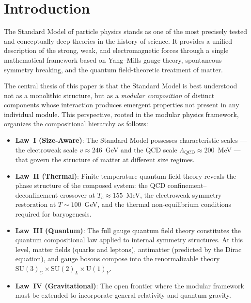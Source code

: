 \documentclass[12pt]{article}
\theoremstyle{definition}
\theoremstyle{remark}
\newcommand{\su}[1]{\mathrm{SU}(#1)}
\newcommand{\uu}[1]{\mathrm{U}(#1)}
\begin{document}
\tableofcontents
\newpage

\section{Introduction}
\label{sec:introduction}

The Standard Model of particle physics stands as one of the most precisely tested and conceptually deep theories in the history of science. It provides a unified description of the strong, weak, and electromagnetic forces through a single mathematical framework based on Yang--Mills gauge theory, spontaneous symmetry breaking, and the quantum field-theoretic treatment of matter.

The central thesis of this paper is that the Standard Model is best understood not as a monolithic structure, but as a \emph{modular composition} of distinct components whose interaction produces emergent properties not present in any individual module. This perspective, rooted in the modular physics framework, organizes the compositional hierarchy as follows:

\begin{itemize}
\item \textbf{Law~I (Size-Aware)}: The Standard Model possesses characteristic scales --- the electroweak scale $v \approx 246$~GeV and the QCD scale $\Lambda_{\mathrm{QCD}} \approx 200$~MeV --- that govern the structure of matter at different size regimes.

\item \textbf{Law~II (Thermal)}: Finite-temperature quantum field theory reveals the phase structure of the composed system: the QCD confinement--deconfinement crossover at $T_c \approx 155$~MeV, the electroweak symmetry restoration at $T \sim 100$~GeV, and the thermal non-equilibrium conditions required for baryogenesis.

\item \textbf{Law~III (Quantum)}: The full gauge quantum field theory constitutes the quantum compositional law applied to internal symmetry structures. At this level, matter fields (quarks and leptons), antimatter (predicted by the Dirac equation), and gauge bosons compose into the renormalizable theory $\su{3}_C \times \su{2}_L \times \uu{1}_Y$.

\item \textbf{Law~IV (Gravitational)}: The open frontier where the modular framework must be extended to incorporate general relativity and quantum gravity.
\end{itemize}
\end{document}
